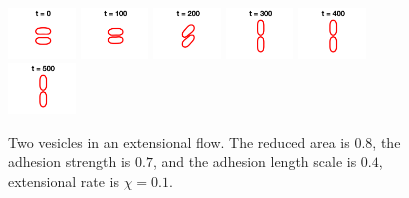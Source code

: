 \documentclass[%
preprint,
 amsmath,amssymb,
 aps,
]{revtex4-1}
\begin{document}
\begin{figure}[htp]
  \includegraphics[width = 0.16\textwidth]{figs/extensional_adR4em1adS7em1Chi1em1_ra080_image01.png}
  \includegraphics[width = 0.16\textwidth]{figs/extensional_adR4em1adS7em1Chi1em1_ra080_image02.png}
  \includegraphics[width = 0.16\textwidth]{figs/extensional_adR4em1adS7em1Chi1em1_ra080_image03.png}
  \includegraphics[width = 0.16\textwidth]{figs/extensional_adR4em1adS7em1Chi1em1_ra080_image04.png}
  \includegraphics[width = 0.16\textwidth]{figs/extensional_adR4em1adS7em1Chi1em1_ra080_image05.png}
  \includegraphics[width = 0.16\textwidth]{figs/extensional_adR4em1adS7em1Chi1em1_ra080_image06.png}
  \caption{Two vesicles in an extensional flow.  The reduced area is
  $0.8$, the adhesion strength is $0.7$, and the adhesion length scale
is $0.4$, extensional rate is $\chi = 0.1$.}
\end{figure}
\end{document}
